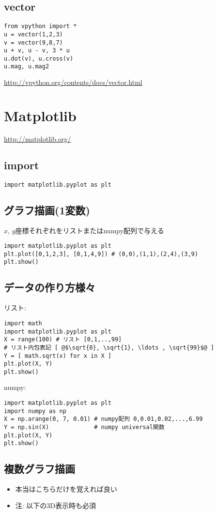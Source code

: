 \documentclass[landscape,7pt,dvipdfmx]{article}
\begin{document}
\begin{multicols*}{3}
\subsection{vector}
\begin{lstlisting}
from vpython import *
u = vector(1,2,3)
v = vector(9,8,7)
u + v, u - v, 3 * u
u.dot(v), u.cross(v)
u.mag, u.mag2
\end{lstlisting}
\url{http://vpython.org/contents/docs/vector.html}

\section{Matplotlib}
\url{http://matplotlib.org/}
\subsection{import}
\begin{lstlisting}
import matplotlib.pyplot as plt
\end{lstlisting}

\subsection{グラフ描画(1変数)}
$x$, $y$座標それぞれをリストまたはnumpy配列で与える
\begin{lstlisting}
import matplotlib.pyplot as plt
plt.plot([0,1,2,3], [0,1,4,9]) # (0,0),(1,1),(2,4),(3,9)
plt.show()
\end{lstlisting}

\subsection{データの作り方様々}
リスト:
\begin{lstlisting}
import math
import matplotlib.pyplot as plt
X = range(100) # リスト [0,1,..,99]
# リスト内包表記 [ @$\sqrt{0}, \sqrt{1}, \ldots , \sqrt{99}$@ ]
Y = [ math.sqrt(x) for x in X ] 
plt.plot(X, Y)
plt.show()
\end{lstlisting}
numpy:
\begin{lstlisting}
import matplotlib.pyplot as plt
import numpy as np 
X = np.arange(0, 7, 0.01) # numpy配列 0,0.01,0.02,...,6.99
Y = np.sin(X)             # numpy universal関数
plt.plot(X, Y)
plt.show()
\end{lstlisting}

\subsection{複数グラフ描画}
\begin{itemize}
\item 本当はこちらだけを覚えれば良い
\item 注: 以下の3D表示時も必須
\end{itemize}


\end{multicols*}
\end{document}

